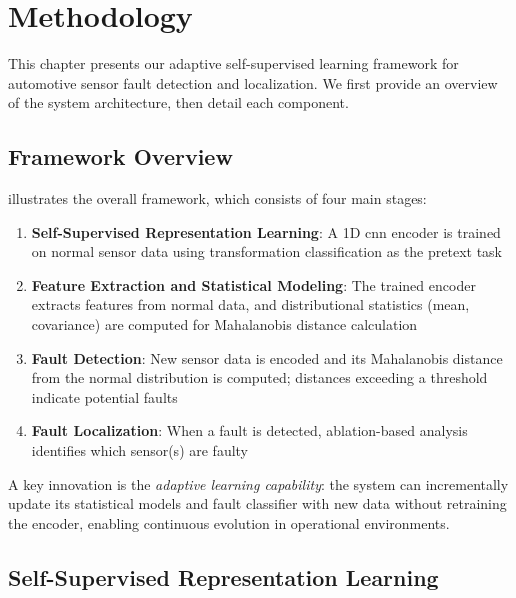 \chapter{Methodology}
\label{chap:methodology}

This chapter presents our adaptive self-supervised learning framework for automotive sensor fault detection and localization. We first provide an overview of the system architecture, then detail each component.

\section{Framework Overview}

 illustrates the overall framework, which consists of four main stages:

\begin{enumerate}
    \item \textbf{Self-Supervised Representation Learning}: A 1D \gls{cnn} encoder is trained on normal sensor data using transformation classification as the pretext task
    \item \textbf{Feature Extraction and Statistical Modeling}: The trained encoder extracts features from normal data, and distributional statistics (mean, covariance) are computed for Mahalanobis distance calculation
    \item \textbf{Fault Detection}: New sensor data is encoded and its Mahalanobis distance from the normal distribution is computed; distances exceeding a threshold indicate potential faults
    \item \textbf{Fault Localization}: When a fault is detected, ablation-based analysis identifies which sensor(s) are faulty
\end{enumerate}

A key innovation is the \textit{adaptive learning capability}: the system can incrementally update its statistical models and fault classifier with new data without retraining the encoder, enabling continuous evolution in operational environments.


\section{Self-Supervised Representation Learning}

